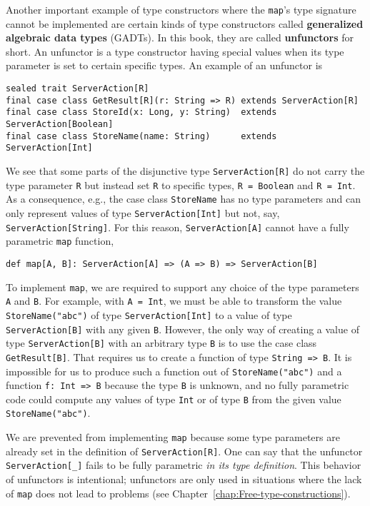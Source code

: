 Another important example of type constructors where the \lstinline!map!\textsf{'}s
type signature cannot be implemented are certain kinds of type constructors
called \textbf{generalized
algebraic data types} (GADTs). In this book, they are
called \textbf{unfunctors} for short. An unfunctor
is a type constructor having special values when its type parameter
is set to certain specific types. An example of an unfunctor is
\begin{lstlisting}
sealed trait ServerAction[R]
final case class GetResult[R](r: String => R) extends ServerAction[R]
final case class StoreId(x: Long, y: String)  extends ServerAction[Boolean]
final case class StoreName(name: String)      extends ServerAction[Int]
\end{lstlisting}
We see that some parts of the disjunctive type \lstinline!ServerAction[R]!
do not carry the type parameter \lstinline!R! but instead set \lstinline!R!
to specific types, \lstinline!R = Boolean! and \lstinline!R = Int!.
As a consequence, e.g., the case class \lstinline!StoreName! has
no type parameters and can only represent values of type \lstinline!ServerAction[Int]!
but not, say, \lstinline!ServerAction[String]!. For this reason,
\lstinline!ServerAction[A]! cannot have a fully parametric \lstinline!map!
function, 
\begin{lstlisting}
def map[A, B]: ServerAction[A] => (A => B) => ServerAction[B]
\end{lstlisting}
To implement \lstinline!map!, we are required to support any choice
of the type parameters \lstinline!A! and \lstinline!B!. For example,
with \lstinline!A = Int!, we must be able to transform the value
\lstinline!StoreName("abc")! of type \lstinline!ServerAction[Int]!
to a value of type \lstinline!ServerAction[B]! with any given \lstinline!B!.
However, the only way of creating a value of type \lstinline!ServerAction[B]!
with an arbitrary type \lstinline!B! is to use the case class \lstinline!GetResult[B]!.
That requires us to create a function of type \lstinline!String => B!.
It is impossible for us to produce such a function out of \lstinline!StoreName("abc")!
and a function \lstinline!f: Int => B! because the type \lstinline!B!
is unknown, and no fully parametric code could compute any values
of type \lstinline!Int! or of type \lstinline!B! from the given
value \lstinline!StoreName("abc")!. 

We are prevented from implementing \lstinline!map! because some type
parameters are already set in the definition of \lstinline!ServerAction[R]!.
One can say that the unfunctor \lstinline!ServerAction[_]! fails
to be fully parametric \emph{in its type definition}. This behavior
of unfunctors is intentional; unfunctors are only used in situations
where the lack of \lstinline!map! does not lead to problems (see
Chapter~\ref{chap:Free-type-constructions}).


